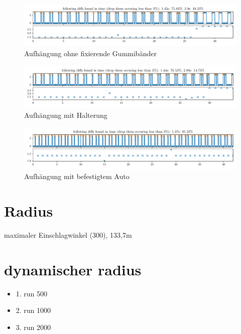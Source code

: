 \documentclass[10pt]{article}
\begin{document}
\begin{figure}[htbp]
    \centering
    \includegraphics[width=\textwidth]{figures/AufhaengungohneGummi.pdf}
    \caption{Aufhängung ohne fixierende Gummibänder}\label{fig:AufhaengungohneGummi}
\end{figure}
\begin{figure}[htbp]
    \centering
    \includegraphics[width=\textwidth]{figures/AufhaengungmitGummi.pdf}
    \caption{Aufhängung mit Halterung}\label{fig:AufhaengungmitGummi}
\end{figure}
\begin{figure}[htbp]
    \centering
    \includegraphics[width=\textwidth]{figures/AufhaengungmitGummiundAuto.pdf}
    \caption{Aufhängung mit befestigtem Auto}\label{fig:AufhaengungmitGummiundAuto}
\end{figure}


\section{Radius}
maximaler Einschlagwinkel (300), 133,7m


\section{dynamischer radius}
\begin{itemize}
    \item 1. run 500
    \item 2. run 1000
    \item 3. run 2000
\end{itemize}
\end{document}
